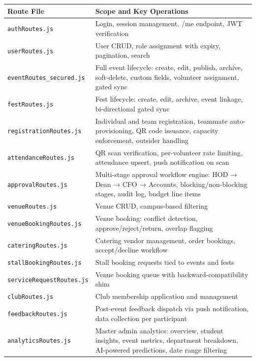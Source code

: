 \documentclass[12pt,a4paper]{article}
\begin{document}
\begin{longtable}{L{4.5cm} X}
\toprule
{}
\textbf{Route File} & \textbf{Scope and Key Operations} \\
\midrule
\endhead
\texttt{authRoutes.js} & Login, session management, /me endpoint, JWT verification \\
\addlinespace
\texttt{userRoutes.js} & User CRUD, role assignment with expiry, pagination, search \\
\addlinespace
\texttt{eventRoutes\_secured.js} & Full event lifecycle: create, edit, publish, archive, soft-delete, custom fields, volunteer assignment, gated sync \\
\addlinespace
\texttt{festRoutes.js} & Fest lifecycle: create, edit, archive, event linkage, bi-directional gated sync \\
\addlinespace
\texttt{registrationRoutes.js} & Individual and team registration, teammate auto-provisioning, QR code issuance, capacity enforcement, outsider handling \\
\addlinespace
\texttt{attendanceRoutes.js} & QR scan verification, per-volunteer rate limiting, attendance upsert, push notification on scan \\
\addlinespace
\texttt{approvalRoutes.js} & Multi-stage approval workflow engine: HOD → Dean → CFO → Accounts, blocking/non-blocking stages, audit log, budget line items \\
\addlinespace
\texttt{venueRoutes.js} & Venue CRUD, campus-based filtering \\
\addlinespace
\texttt{venueBookingRoutes.js} & Venue booking: conflict detection, approve/reject/return, overlap flagging \\
\addlinespace
\texttt{cateringRoutes.js} & Catering vendor management, order bookings, accept/decline workflow \\
\addlinespace
\texttt{stallBookingRoutes.js} & Stall booking requests tied to events and fests \\
\addlinespace
\texttt{serviceRequestRoutes.js} & Venue booking queue with backward-compatibility shim \\
\addlinespace
\texttt{clubRoutes.js} & Club membership application and management \\
\addlinespace
\texttt{feedbackRoutes.js} & Post-event feedback dispatch via push notification, data collection per participant \\
\addlinespace
\texttt{analyticsRoutes.js} & Master admin analytics: overview, student insights, event metrics, department breakdown, AI-powered predictions, date range filtering \\

\end{longtable}
\end{document}
